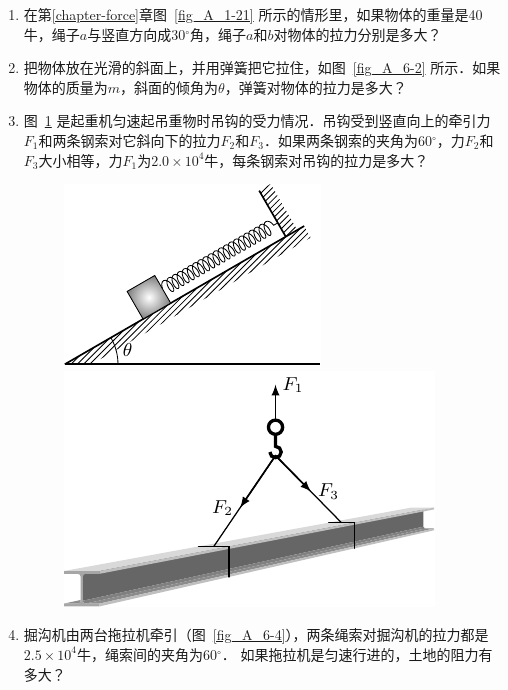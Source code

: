 \begin{enumerate}
    \item 在第\ref{chapter-force}章图~\ref{fig_A_1-21} 所示的情形里，如果物体的重量是40牛，绳子$a$与竖直方向成30$^\circ$角，绳子$a$和$b$对物体的拉力分别是多大？
    \item 把物体放在光滑的斜面上，并用弹簧把它拉住，如图~\ref{fig_A_6-2} 所示．如果物体的质量为$m$，斜面的倾角为$\theta$，弹簧对物体的拉力是多大？
    \item 图~\ref{fig_A_6-3} 是起重机匀速起吊重物时吊钩的受力情况．吊钩受到竖直向上的牵引力$F_1$和两条钢索对它斜向下的拉力$F_2$和$F_3$．如果两条钢索的夹角为60$^\circ$，力$F_2$和$F_3$大小相等，力$F_1$为$2.0\times 10^4$牛，每条钢索对吊钩的拉力是多大？

\begin{figure}[htbp]
    \centering
    \begin{minipage}[t]{0.48\textwidth}
        \centering
        \includegraphics{fig/A/6-2.pdf}
        \caption{}\label{fig_A_6-2}
    \end{minipage}
    \begin{minipage}[t]{0.48\textwidth}
        \centering
        \includegraphics{fig/A/6-3.pdf}
        \caption{}\label{fig_A_6-3}
    \end{minipage}
\end{figure}
    \item 掘沟机由两台拖拉机牵引（图~\ref{fig_A_6-4}），两条绳索对掘沟机的拉力都是$2.5\times 10^4$牛，绳索间的夹角为60$^\circ$．
    如果拖拉机是匀速行进的，土地的阻力有多大？


\end{enumerate}
